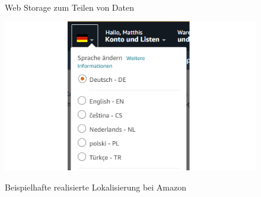 \begin{figure}[hbt!]
	\centering
	\begin{minipage}[t]{0.55\textwidth}	
		\caption{Web Storage zum Teilen von Daten}
		\\ %
		\label{fig:MFSharingDataWebStorage}
	\end{minipage}
\end{figure}

\newpage
\begin{figure}[hbt!]
	\centering
	\begin{minipage}[t]{0.65\textwidth}	
		\caption{Beispielhafte realisierte Lokalisierung bei Amazon}
		\includegraphics[width=1\textwidth]{img/appendix/PortalshellLokalisierung.PNG}\\ %
		\label{fig:PortalshellLokalisierung}
	\end{minipage}
\end{figure}

